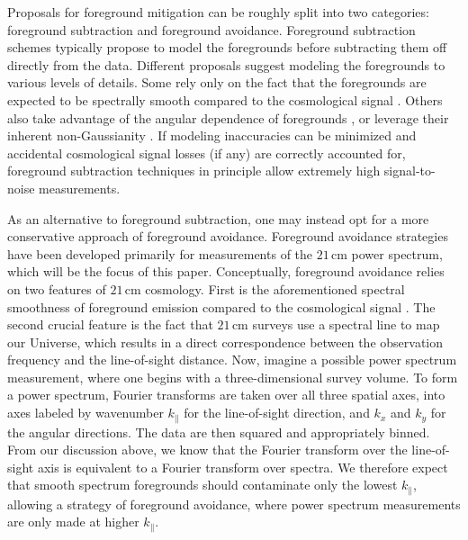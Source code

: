 \documentclass[twocolumn,aps,prd,nofootinbib,showpacs]{revtex4-1}
\begin{document}
Proposals for foreground mitigation can be roughly split into two categories: foreground subtraction and foreground avoidance.  Foreground subtraction schemes typically propose to model the foregrounds before subtracting them off directly from the data.  Different proposals suggest modeling the foregrounds to various levels of details.  Some rely only on the fact that the foregrounds are expected to be spectrally smooth compared to the cosmological signal \cite{Wang2006,Gleser2008,Liu2009a,Bowman2009,Harker2009,Liu2009b,Petrovic2011,Cho2012,Liu2012,Parsons2012b}.  Others also take advantage of the angular dependence of foregrounds \cite{Paciga2011,Liu2011,Dillon2013,Masui2013,Dillon2014}, or leverage their inherent non-Gaussianity \cite{Chapman2012,Chapman2013}.  If modeling inaccuracies can be minimized and accidental cosmological signal losses (if any) are correctly accounted for, foreground subtraction techniques in principle allow extremely high signal-to-noise measurements.

As an alternative to foreground subtraction, one may instead opt for a more conservative approach of foreground avoidance.  Foreground avoidance strategies have been developed primarily for measurements of the $21\,\textrm{cm}$ power spectrum, which will be the focus of this paper.  Conceptually, foreground avoidance relies on two features of $21\,\textrm{cm}$ cosmology.  First is the aforementioned spectral smoothness of foreground emission compared to the cosmological signal \cite{Oh2003}.  The second crucial feature is the fact that $21\,\textrm{cm}$ surveys use a spectral line to map our Universe, which results in a direct correspondence between the observation frequency and the line-of-sight distance.  Now, imagine a possible power spectrum measurement, where one begins with a three-dimensional survey volume.  To form a power spectrum, Fourier transforms are taken over all three spatial axes, into axes labeled by wavenumber $k_\parallel$ for the line-of-sight direction, and $k_x$ and $k_y$ for the angular directions.  The data are then squared and appropriately binned.  From our discussion above, we know that the Fourier transform over the line-of-sight axis is equivalent to a Fourier transform over spectra.  We therefore expect that smooth spectrum foregrounds should contaminate only the lowest $k_\parallel$, allowing a strategy of foreground avoidance, where power spectrum measurements are only made at higher $k_\parallel$.
\end{document}
